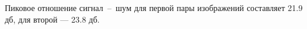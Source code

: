 Пиковое отношение сигнал~--~шум для первой пары изображений составляет 21.9 дб, для второй --- 23.8 дб.
%
%
%
%
%
%
%
%
%
%
%

